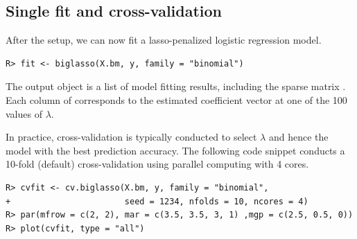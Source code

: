 \subsection{Single fit and cross-validation}

After the setup, we can now fit a lasso-penalized logistic regression model.
\begin{verbatim}
R> fit <- biglasso(X.bm, y, family = "binomial")
\end{verbatim}

The output object  is a list of model fitting results, including the sparse matrix . Each column of  corresponds to the estimated coefficient vector at one of the 100 values of $\lambda$.



In practice, cross-validation is typically conducted to select $\lambda$ and hence the model with the best prediction accuracy. The following code snippet conducts a 10-fold (default) cross-validation using parallel computing with 4 cores.
\begin{verbatim}
R> cvfit <- cv.biglasso(X.bm, y, family = "binomial",
+                       seed = 1234, nfolds = 10, ncores = 4)
R> par(mfrow = c(2, 2), mar = c(3.5, 3.5, 3, 1) ,mgp = c(2.5, 0.5, 0))
R> plot(cvfit, type = "all")
\end{verbatim}

